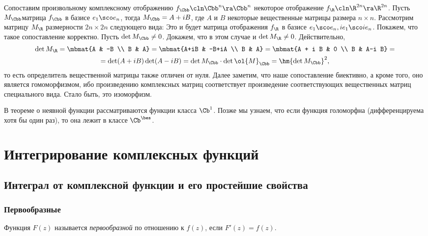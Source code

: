 \documentclass[a4paper]{article}
\begin{document}
Сопоставим произвольному комплексному отображению $f_\Cbb\cln \Cbb^n\ra\Cbb^n$ некоторое отображение $f_\R\cln \R^{2n}\ra\R^{2n}$.
Пусть $M_\Cbb$\т матрица $f_\Cbb$ в базисе $e_1 \sco e_n$, тогда $M_\Cbb = A+iB$, где $A$ и $B$\т
некоторые вещественные матрицы размера $n\times n$. Рассмотрим матрицу $M_\R$ размерности $2n\times 2n$ следующего вида:
Это и будет матрица отображения $f_\R$ в базисе $e_1 \sco e_n, i e_1 \sco i e_n$. Покажем, что такое
сопоставление корректно. Пусть $\det M_\Cbb \neq 0$. Докажем, что в этом случае и $\det M_\R\neq 0$. Действительно,
\begin{multline}
\det M_\R = \mbmat{A & -B \\ B & A} = \mbmat{A+iB & -B+iA \\ B & A} = \mbmat{A + i B & 0 \\  B &  A-i B} =\\
=\det(A+iB)\det(A-i B)= \det M_\Cbb \cdot \det \ol{M}_\Cbb  = \hm{\det M_\Cbb}^2,
\end{multline}
то есть определитель вещественной матрицы также отличен от нуля. Далее заметим, что наше сопоставление
биективно, а кроме того, оно является гомоморфизмом, ибо произведению комплексных матриц соответствует
произведение соответствующих вещественных матриц специального вида. Стало быть, это изоморфизм.

\begin{note}
В теореме о неявной функции рассматриваются функции класса $\Cb^1$. Позже мы узнаем, что если функция
голоморфна ( дифференцируема хотя бы один раз), то она лежит в классе $\Cb^\bes$.
\end{note}

\section{Интегрирование комплексных функций}

\subsection{Интеграл от комплексной функции и его простейшие свойства}

\subsubsection{Первообразные}

\begin{df}
Функция $F(z)$ называется \emph{первообразной} по отношению к $f(z)$, если $F'(z)=f(z)$.
\end{df}
\end{document}
